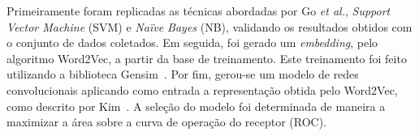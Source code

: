 Primeiramente foram replicadas as técnicas abordadas por Go \textit{et al.}, \textit{Support Vector Machine} (SVM) e
\textit{Naïve Bayes} (NB), validando os resultados obtidos com o conjunto de dados coletados.
Em seguida, foi gerado um \textit{embedding}, pelo algoritmo Word2Vec, a partir da base de treinamento. Este treinamento
foi feito utilizando a biblioteca Gensim~\cite{gensim}.
Por fim, gerou-se um modelo de redes convolucionais aplicando como entrada a representação obtida pelo Word2Vec, como
descrito por Kim~\cite{kim14}.
A seleção do modelo foi determinada de maneira a maximizar a área sobre a curva de operação do receptor (ROC).
